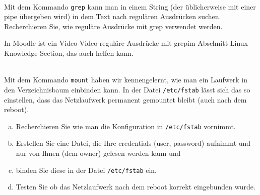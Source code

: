 \newcommand{\printpraesenzlsg}{false}
\newcommand{\printloesungen}{false}
\newcommand{\printbewertungen}{false}
\newcommand{\blattnummer}{1}



\iforiginal{}

	

 \\
Mit dem Kommando \texttt{grep} kann man in einem String (der üblicherweise mit einer pipe übergeben wird) in dem Text nach
regulären Ausdrücken suchen. Recherchieren Sie, wie reguläre Ausdrücke mit grep verwendet werden.

\begin{notes}
  In Moodle ist ein Video \glqq Video reguläre Ausdrücke mit grep\grqq im Abschnitt \glqq Linux Knowledge Section\grqq, das auch helfen kann.
\end{notes}

 \\
Mit dem Kommando \texttt{mount} haben wir kennengelernt, wie man ein Laufwerk in den Verzeichnisbaum einbinden kann. In der Datei \texttt{/etc/fstab} lässt sich das
so einstellen, dass das Netzlaufwerk permanent gemountet bleibt (auch nach dem reboot).
\begin{enumerate}[(a)]
  \item Recherchieren Sie wie man die Konfiguration in \texttt{/etc/fstab} vornimmt.
  \item Erstellen Sie eine Datei, die Ihre credentials (user, password) aufnimmt und nur von Ihnen (dem owner) gelesen werden kann und
  \item binden Sie diese in der Datei \texttt{/etc/fstab} ein.
  \item Testen Sie ob das Netzlaufwerk nach dem reboot korrekt eingebunden wurde.
\end{enumerate}

